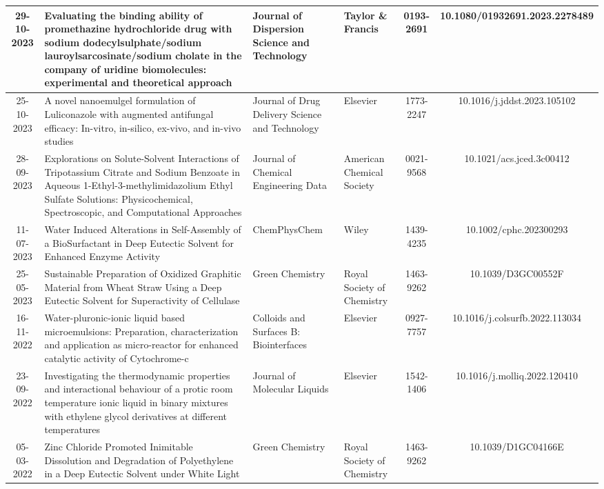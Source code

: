 \documentclass{article}
\begin{document}
\begin{landscape}
\begin{longtable}{|c|p{6cm}|p{3cm}|p{3cm}|c|c|}
		29-10-2023 & Evaluating the binding ability of promethazine hydrochloride drug with sodium dodecylsulphate/sodium lauroylsarcosinate/sodium cholate in the company of uridine biomolecules: experimental and theoretical approach & Journal of Dispersion Science and Technology & Taylor \& Francis & 0193-2691 & 10.1080/01932691.2023.2278489 \\
		\hline
		
		25-10-2023 & A novel nanoemulgel formulation of Luliconazole with augmented antifungal efficacy: In-vitro, in-silico, ex-vivo, and in-vivo studies & Journal of Drug Delivery Science and Technology & Elsevier & 1773-2247 & 10.1016/j.jddst.2023.105102 \\
		\hline
		
		28-09-2023 & Explorations on Solute-Solvent Interactions of Tripotassium Citrate and Sodium Benzoate in Aqueous 1-Ethyl-3-methylimidazolium Ethyl Sulfate Solutions: Physicochemical, Spectroscopic, and Computational Approaches & Journal of Chemical Engineering Data & American Chemical Society & 0021-9568 & 10.1021/acs.jced.3c00412 \\
		\hline
		
		11-07-2023 & Water Induced Alterations in Self-Assembly of a BioSurfactant in Deep Eutectic Solvent for Enhanced Enzyme Activity & ChemPhysChem & Wiley & 1439-4235 & 10.1002/cphc.202300293 \\
		\hline
		
		25-05-2023 & Sustainable Preparation of Oxidized Graphitic Material from Wheat Straw Using a Deep Eutectic Solvent for Superactivity of Cellulase & Green Chemistry & Royal Society of Chemistry & 1463-9262 & 10.1039/D3GC00552F \\
		\hline
		
		16-11-2022 & Water-pluronic-ionic liquid based microemulsions: Preparation, characterization and application as micro-reactor for enhanced catalytic activity of Cytochrome-c & Colloids and Surfaces B: Biointerfaces & Elsevier & 0927-7757 & 10.1016/j.colsurfb.2022.113034 \\
		\hline
		
		23-09-2022 & Investigating the thermodynamic properties and interactional behaviour of a protic room temperature ionic liquid in binary mixtures with ethylene glycol derivatives at different temperatures & Journal of Molecular Liquids & Elsevier & 1542-1406 & 10.1016/j.molliq.2022.120410 \\
		\hline
		
		05-03-2022 & Zinc Chloride Promoted Inimitable Dissolution and Degradation of Polyethylene in a Deep Eutectic Solvent under White Light & Green Chemistry & Royal Society of Chemistry & 1463-9262 & 10.1039/D1GC04166E \\
		\hline
		

\end{longtable}
\end{landscape}
\end{document}
